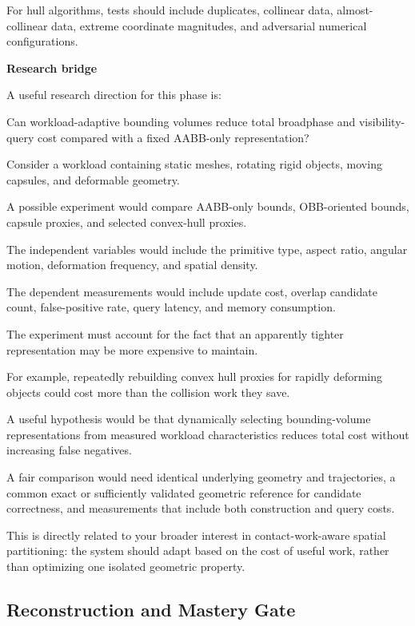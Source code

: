 For hull algorithms, tests should include duplicates, collinear data, almost-collinear data, extreme coordinate magnitudes, and adversarial numerical configurations.

\textbf{Research bridge}

A useful research direction for this phase is:

Can workload-adaptive bounding volumes reduce total broadphase and visibility-query cost compared with a fixed AABB-only representation?

Consider a workload containing static meshes, rotating rigid objects, moving capsules, and deformable geometry.

A possible experiment would compare AABB-only bounds, OBB-oriented bounds, capsule proxies, and selected convex-hull proxies.

The independent variables would include the primitive type, aspect ratio, angular motion, deformation frequency, and spatial density.

The dependent measurements would include update cost, overlap candidate count, false-positive rate, query latency, and memory consumption.

The experiment must account for the fact that an apparently tighter representation may be more expensive to maintain.

For example, repeatedly rebuilding convex hull proxies for rapidly deforming objects could cost more than the collision work they save.

A useful hypothesis would be that dynamically selecting bounding-volume representations from measured workload characteristics reduces total cost without increasing false negatives.

A fair comparison would need identical underlying geometry and trajectories, a common exact or sufficiently validated geometric reference for candidate correctness, and measurements that include both construction and query costs.

This is directly related to your broader interest in contact-work-aware spatial partitioning: the system should adapt based on the cost of useful work, rather than optimizing one isolated geometric property.

\subsection{Reconstruction and Mastery Gate}\label{04-visual-computing-ii-ch022-reconstruction-and-mastery-gate}

